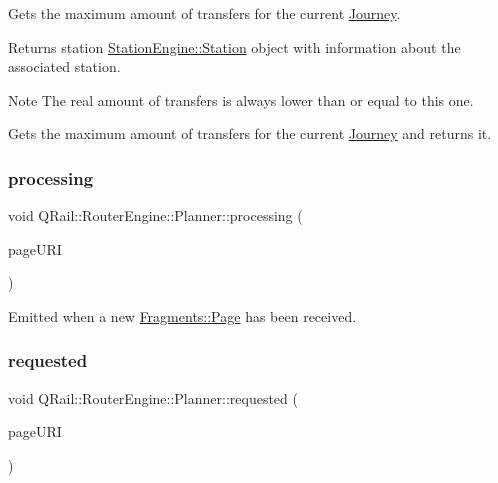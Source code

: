 Gets the maximum amount of transfers for the current \mbox{\hyperlink{classQRail_1_1RouterEngine_1_1Journey}{Journey}}. 

\begin{DoxyReturn}{Returns}
station \mbox{\hyperlink{classQRail_1_1StationEngine_1_1Station}{Station\+Engine\+::\+Station}} object with information about the associated station. 
\end{DoxyReturn}
\begin{DoxyNote}{Note}
The real amount of transfers is always lower than or equal to this one.
\end{DoxyNote}
Gets the maximum amount of transfers for the current \mbox{\hyperlink{classQRail_1_1RouterEngine_1_1Journey}{Journey}} and returns it. \mbox{\label{classQRail_1_1RouterEngine_1_1Planner_a2ea8cbe8a514124729079cd793ff8454}} 
\subsubsection{\texorpdfstring{processing}{processing}}
{\footnotesize\ttfamily void Q\+Rail\+::\+Router\+Engine\+::\+Planner\+::processing (\begin{DoxyParamCaption}\item[{const Q\+Url \&}]{page\+U\+RI }\end{DoxyParamCaption})\hspace{0.3cm}{\ttfamily [signal]}}



Emitted when a new \mbox{\hyperlink{classQRail_1_1Fragments_1_1Page}{Fragments\+::\+Page}} has been received. 

\mbox{\label{classQRail_1_1RouterEngine_1_1Planner_a048be5d38aa731894e585aa4ceb4bc68}} 
\subsubsection{\texorpdfstring{requested}{requested}}
{\footnotesize\ttfamily void Q\+Rail\+::\+Router\+Engine\+::\+Planner\+::requested (\begin{DoxyParamCaption}\item[{const Q\+Url \&}]{page\+U\+RI }\end{DoxyParamCaption})\hspace{0.3cm}{\ttfamily [signal]}}



